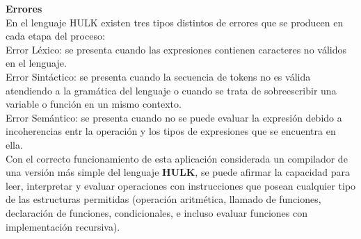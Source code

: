 \documentclass{article}
\begin{document}
\begin{flushleft}
\Large {\textbf{Errores}}\linebreak \\
\large {En el lenguaje HULK existen tres tipos distintos de errores que se producen en cada etapa del proceso:}\linebreak \\
\large {Error Léxico: se presenta cuando las expresiones contienen caracteres no válidos en el lenguaje.}\linebreak \\
\large {Error Sintáctico: se presenta cuando la secuencia de tokens no es válida atendiendo a la gramática del lenguaje o cuando se trata de sobreescribir una variable o función en un mismo contexto.}\linebreak \\
\large {Error Semántico: se presenta cuando no se puede evaluar la expresión debido a incoherencias entr la operación y  los tipos de expresiones que se encuentra en ella.}\linebreak \\

\large {Con el correcto funcionamiento de esta aplicación considerada un compilador de una versión más simple del lenguaje \textbf{HULK}, se puede afirmar la capacidad para leer, interpretar y evaluar operaciones con instrucciones que posean cualquier tipo de las estructuras permitidas (operación aritmética,  llamado de funciones, declaración de funciones, condicionales, e incluso evaluar funciones con implementación recursiva).}\linebreak \\
\end{flushleft}
\end{document}
